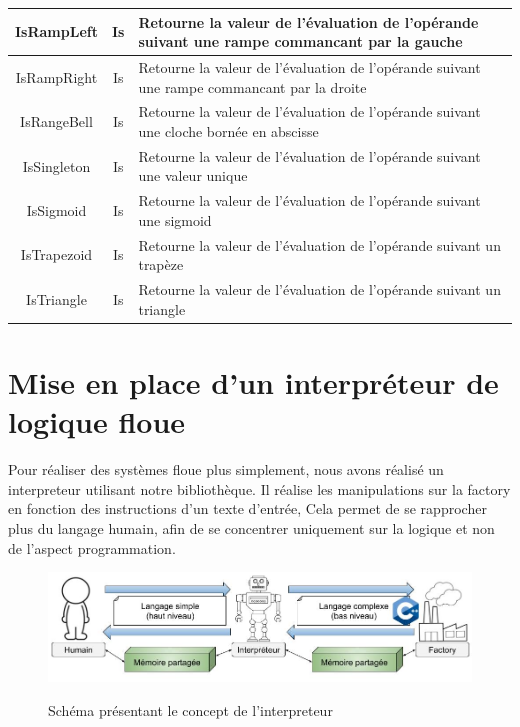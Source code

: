 \documentclass[a4paper,11pt]{article}
\begin{document}
\begin{table}[H]
\begin{center}
\begin{tabular}{|c|c|M{12cm}|}
                \hline
                IsRampLeft & Is & Retourne la valeur de l'évaluation de l'opérande suivant une rampe commancant par la gauche \tabularnewline
                \hline
                IsRampRight & Is & Retourne la valeur de l'évaluation de l'opérande suivant une rampe commancant par la droite \tabularnewline
                \hline
                IsRangeBell & Is & Retourne la valeur de l'évaluation de l'opérande suivant une cloche bornée en abscisse \tabularnewline
                \hline
                IsSingleton & Is & Retourne la valeur de l'évaluation de l'opérande suivant une valeur unique \tabularnewline
                \hline
                IsSigmoid & Is & Retourne la valeur de l'évaluation de l'opérande suivant une sigmoid \tabularnewline
                \hline
                IsTrapezoid & Is & Retourne la valeur de l'évaluation de l'opérande suivant un trapèze \tabularnewline
                \hline
                IsTriangle & Is & Retourne la valeur de l'évaluation de l'opérande suivant un triangle \tabularnewline
                \hline
            \end{tabular}
        \end{center}
    \end{table}

    \section{Mise en place d'un interpréteur de logique floue}

    Pour réaliser des systèmes floue plus simplement, nous avons réalisé un interpreteur utilisant notre bibliothèque.
    Il réalise les manipulations sur la factory en fonction des instructions d'un texte d'entrée,
    Cela permet de se rapprocher plus du langage humain, afin de se concentrer uniquement sur la logique et non de l'aspect programmation.

    \begin{figure}[H]
        \begin{center}
            \caption{Schéma présentant le concept de l'interpreteur}
            \includegraphics[scale=0.5]{assets/Interpreteur_Dessin.jpg}
            \label{fig:interpreterDessin}
        \end{center}
    \end{figure}
\end{document}
